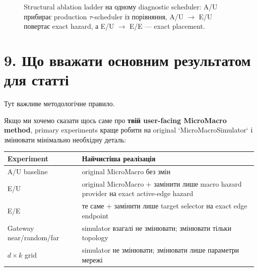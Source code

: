 \documentclass[11pt,a4paper]{article}
\begin{document}
\begin{figure}[h!]
\centering
{}
\caption{Structural ablation ladder на одному diagnostic scheduler: A/U прибирає production $\tau$-scheduler із порівняння, A/U $\to$ E/U повертає exact hazard, а E/U $\to$ E/E --- exact placement.}
\end{figure}

\section*{9. Що вважати основним результатом для статті}

Тут важливе методологічне правило.

Якщо ми хочемо сказати щось саме про \textbf{твій user-facing MicroMacro method}, primary experiments краще робити на original `MicroMacroSimulator` і змінювати мінімально необхідну деталь:

\begin{center}
\begin{tabular}{p{35mm} p{107mm}}
\toprule
\textbf{Experiment} & \textbf{Найчистіша реалізація}\\
\midrule
A/U baseline & original MicroMacro без змін\\
E/U & original MicroMacro + замінити лише macro hazard provider на exact active-edge hazard\\
E/E & те саме + замінити лише target selector на exact edge endpoint\\
Gateway near/random/far & simulator взагалі не змінювати; змінювати тільки topology\\
$d\times k$ grid & simulator не змінювати; змінювати лише параметри мережі\\
\bottomrule
\end{tabular}
\end{center}
\end{document}
